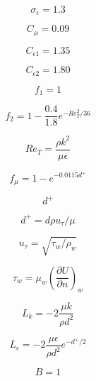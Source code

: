 \begin{equation}
\sigma_{\epsilon} = 1.3
\end{equation}

\begin{equation}
C_{\mu} = 0.09
\end{equation}

\begin{equation}
C_{\epsilon 1} = 1.35
\end{equation}

\begin{equation}
C_{\epsilon 2} = 1.80
\end{equation}

\begin{equation}
f_1 = 1
\end{equation}

\begin{equation}
f_2 = 1 - \frac{0.4}{1.8} e^{-Re_T^2/36}
\end{equation}

\begin{equation}
Re_T = \frac{\rho k^2}{\mu \epsilon}
\end{equation}

\begin{equation}
f_{\mu} = 1 - e^{-0.0115 d^+}
\end{equation}

\begin{equation}
d^+
\end{equation}

\begin{equation}
d^+ = d \rho u_{\tau} / \mu
\end{equation}

\begin{equation}
u_{\tau} = \sqrt{\tau_w/\rho_w}
\end{equation}

\begin{equation}
\tau_w = \mu_w \left( \frac{\partial U}{\partial n} \right)_w
\end{equation}

\begin{equation}
L_k = -2 \frac{\mu k}{\rho d^2}
\end{equation}

\begin{equation}
L_{\epsilon} = -2 \frac{\mu \epsilon}{\rho d^2} e^{-d^+/2}
\end{equation}

\begin{equation}
B=1
\end{equation}


